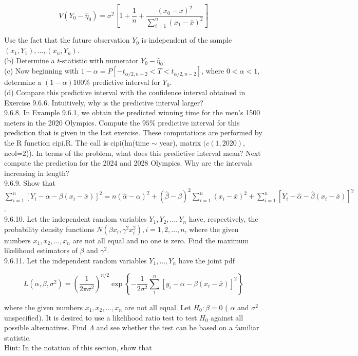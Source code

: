 $$
V\left(Y_{0}-\hat{\eta}_{0}\right)=\sigma^{2}\left[1+\frac{1}{n}+\frac{\left(x_{0}-\bar{x}\right)^{2}}{\sum_{i=1}^{n}\left(x_{1}-\bar{x}\right)^{2}}\right]
$$

Use the fact that the future observation $Y_{0}$ is independent of the sample $\left(x_{1}, Y_{1}\right), \ldots,\left(x_{n}, Y_{n}\right)$.\\
(b) Determine a $t$-statistic with numerator $Y_{0}-\hat{\eta}_{0}$.\\
(c) Now beginning with $1-\alpha=P\left[-t_{\alpha / 2, n-2}<T<t_{\alpha / 2, n-2}\right]$, where $0<\alpha<1$, determine a $(1-\alpha) 100 \%$ predictive interval for $Y_{0}$.\\
(d) Compare this predictive interval with the confidence interval obtained in Exercise 9.6.6. Intuitively, why is the predictive interval larger?\\
9.6.8. In Example 9.6.1, we obtain the predicted winning time for the men's 1500 meters in the 2020 Olympics. Compute the $95 \%$ predictive interval for this prediction that is given in the last exercise. These computations are performed by the R function cipi.R. The call is cipi(lm(time $\sim$ year), matrix $(c(1,2020)$, ncol=2)). In terms of the problem, what does this predictive interval mean? Next compute the prediction for the 2024 and 2028 Olympics. Why are the intervals increasing in length?\\
9.6.9. Show that\\
$\sum_{i=1}^{n}\left[Y_{i}-\alpha-\beta\left(x_{i}-\bar{x}\right)\right]^{2}=n(\hat{\alpha}-\alpha)^{2}+(\hat{\beta}-\beta)^{2} \sum_{i=1}^{n}\left(x_{i}-\bar{x}\right)^{2}+\sum_{i=1}^{n}\left[Y_{i}-\hat{\alpha}-\hat{\beta}\left(x_{i}-\bar{x}\right)\right]^{2}$.\\
9.6.10. Let the independent random variables $Y_{1}, Y_{2}, \ldots, Y_{n}$ have, respectively, the probability density functions $N\left(\beta x_{i}, \gamma^{2} x_{i}^{2}\right), i=1,2, \ldots, n$, where the given numbers $x_{1}, x_{2}, \ldots, x_{n}$ are not all equal and no one is zero. Find the maximum likelihood estimators of $\beta$ and $\gamma^{2}$.\\
9.6.11. Let the independent random variables $Y_{1}, \ldots, Y_{n}$ have the joint pdf

$$
L\left(\alpha, \beta, \sigma^{2}\right)=\left(\frac{1}{2 \pi \sigma^{2}}\right)^{n / 2} \exp \left\{-\frac{1}{2 \sigma^{2}} \sum_{1}^{n}\left[y_{i}-\alpha-\beta\left(x_{i}-\bar{x}\right)\right]^{2}\right\}
$$

where the given numbers $x_{1}, x_{2}, \ldots, x_{n}$ are not all equal. Let $H_{0}: \beta=0$ ( $\alpha$ and $\sigma^{2}$ unspecified). It is desired to use a likelihood ratio test to test $H_{0}$ against all possible alternatives. Find $\Lambda$ and see whether the test can be based on a familiar statistic.\\
Hint: In the notation of this section, show that

